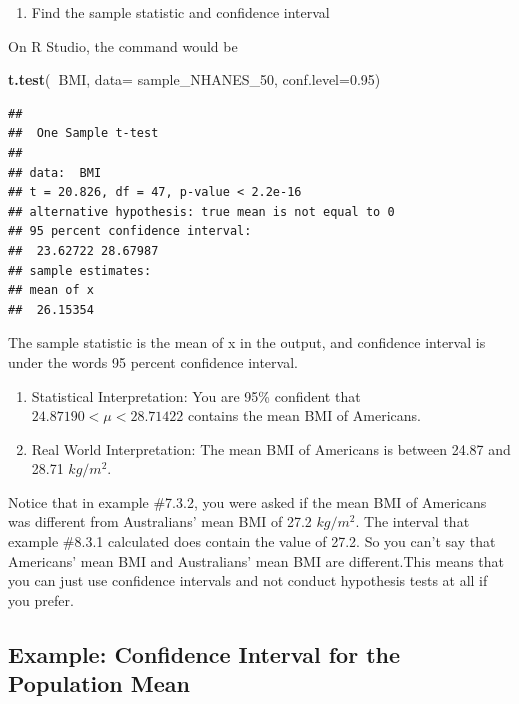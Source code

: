 \documentclass[
]{book}
\newenvironment{Shaded}{\begin{snugshade}}{\end{snugshade}}
\newcommand{\DataTypeTok}[1]{\textcolor[rgb]{0.13,0.29,0.53}{#1}}
\newcommand{\DecValTok}[1]{\textcolor[rgb]{0.00,0.00,0.81}{#1}}
\newcommand{\FloatTok}[1]{\textcolor[rgb]{0.00,0.00,0.81}{#1}}
\newcommand{\KeywordTok}[1]{\textcolor[rgb]{0.13,0.29,0.53}{\textbf{#1}}}
\newcommand{\NormalTok}[1]{#1}
\newcommand{\OperatorTok}[1]{\textcolor[rgb]{0.81,0.36,0.00}{\textbf{#1}}}
\providecommand{\tightlist}{%
  \setlength{\itemsep}{0pt}\setlength{\parskip}{0pt}}
\begin{document}
\begin{enumerate}
\def\labelenumi{\arabic{enumi}.}
\setcounter{enumi}{3}
\tightlist
\item
  Find the sample statistic and confidence interval
\end{enumerate}

On R Studio, the command would be

\begin{Shaded}
\begin{Highlighting}[]
\KeywordTok{t.test}\NormalTok{(}\OperatorTok{~}\NormalTok{BMI, }\DataTypeTok{data=}\NormalTok{ sample_NHANES_}\DecValTok{50}\NormalTok{, }\DataTypeTok{conf.level=}\FloatTok{0.95}\NormalTok{)}
\end{Highlighting}
\end{Shaded}

\begin{verbatim}
## 
##  One Sample t-test
## 
## data:  BMI
## t = 20.826, df = 47, p-value < 2.2e-16
## alternative hypothesis: true mean is not equal to 0
## 95 percent confidence interval:
##  23.62722 28.67987
## sample estimates:
## mean of x 
##  26.15354
\end{verbatim}

The sample statistic is the mean of x in the output, and confidence interval is under the words 95 percent confidence interval.

\begin{enumerate}
\def\labelenumi{\arabic{enumi}.}
\setcounter{enumi}{3}
\item
  Statistical Interpretation: You are 95\% confident that \(24.87190<\mu<28.71422\) contains the mean BMI of Americans.
\item
  Real World Interpretation: The mean BMI of Americans is between 24.87 and 28.71 \(kg/m^2\).
\end{enumerate}

Notice that in example \#7.3.2, you were asked if the mean BMI of Americans was different from Australians' mean BMI of 27.2 \(kg/m^2\). The interval that example \#8.3.1 calculated does contain the value of 27.2. So you can't say that Americans' mean BMI and Australians' mean BMI are different.This means that you can just use confidence intervals and not conduct hypothesis tests at all if you prefer.

\hypertarget{example-confidence-interval-for-the-population-mean-1}{%
\subsection{Example: Confidence Interval for the Population Mean}\label{example-confidence-interval-for-the-population-mean-1}}
\end{document}
